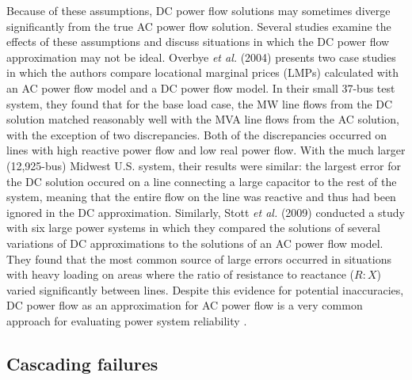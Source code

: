 Because of these assumptions, DC power flow solutions may sometimes diverge significantly from the true AC power flow solution. Several studies examine the effects of these assumptions and discuss situations in which the DC power flow approximation may not be ideal. Overbye \emph{et al.} (2004)\cite{Overbye2004} presents two case studies in which the authors compare locational marginal prices (LMPs) calculated with an AC power flow model and a DC power flow model. In their small 37-bus test system, they found that for the base load case, the MW line flows from the DC solution matched reasonably well with the MVA line flows from the AC solution, with the exception of two discrepancies.  Both of the discrepancies occurred on lines with high reactive power flow and low real power flow.  With the much larger (12,925-bus) Midwest U.S. system, their results were similar: the largest error for the DC solution occured on a line connecting a large capacitor to the rest of the system, meaning that the entire flow on the line was reactive and thus had been ignored in the DC approximation.  Similarly, Stott \emph{et al.} (2009)\cite{Stott2009} conducted a study with six large power systems in which they compared the solutions of several variations of DC approximations to the solutions of an AC power flow model.  They found that the most common source of large errors occurred in situations with heavy loading on areas where the ratio of resistance to reactance ($R:X$) varied significantly between lines. Despite this evidence for potential inaccuracies, DC power flow as an approximation for AC power flow is a very common approach for evaluating power system reliability \cite{Dobson2001, Carreras2002a, Dobson2002, Dobson2003, Salmeron2004, Bier2007, Dobson2007, Pepyne2007, Arianos2009, Salmeron2009, Hines2010}.


\subsection{Cascading failures}
\label{sec:ch1:powerreliability:cascades}

